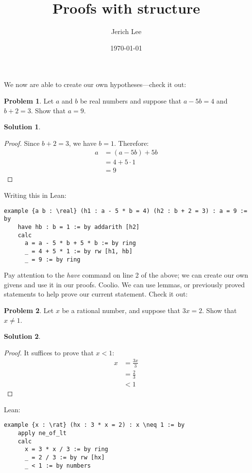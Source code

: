 \documentclass[12pt]{article}
\title{Proofs with structure}
\author{Jerich Lee}
\date{\today}
\theoremstyle{definition} %
\newtheorem{solution}{Solution}
\newtheorem{problem}{Problem}
\theoremstyle{plain} %
\begin{document}
\maketitle
We now are able to create our own hypotheses—check it out:
\begin{problem}
    Let \(a\) and \(b\) be real numbers and suppose that \(a-5b=4\) and \(b+2=3\). Show that \(a=9\).  
\end{problem}
\begin{solution}
    \begin{proof} Since \(b+2=3\), we have \(b=1\). Therefore:
        \begin{align}
           a&=(a-5b)+5b \\[10pt] 
            &=4+5 \cdot1 \\[10pt] 
            &=9
        \end{align}
    \end{proof}
\end{solution}
Writing this in Lean:
\begin{lstlisting}
example {a b : \real} (h1 : a - 5 * b = 4) (h2 : b + 2 = 3) : a = 9 := by
    have hb : b = 1 := by addarith [h2]
    calc
      a = a - 5 * b + 5 * b := by ring
      _ = 4 + 5 * 1 := by rw [h1, hb]
      _ = 9 := by ring
\end{lstlisting}
Pay attention to the \emph{have} command on line 2 of the above; we can create our own givens and use it in our proofs. Coolio.
\vspace{.5cm} 
We can use lemmas, or previously proved statements to help prove our current statement. Check it out:
\begin{problem}
    Let \(x\) be a rational number, and suppose that \(3x=2\). Show that \(x\neq 1\).  
\end{problem}
\begin{solution}
    \begin{proof} It suffices to prove that \(x<1\): 
        \begin{align}
           x&=\frac{3x}{3} \\[10pt] 
           &= \frac{2}{3}\\[10pt] 
            &<1
        \end{align}
    \end{proof}
\end{solution}
Lean:
\begin{lstlisting}
example {x : \rat} (hx : 3 * x = 2) : x \neq 1 := by
    apply ne_of_lt
    calc
      x = 3 * x / 3 := by ring
      _ = 2 / 3 := by rw [hx]
      _ < 1 := by numbers
\end{lstlisting} 
\end{document}
